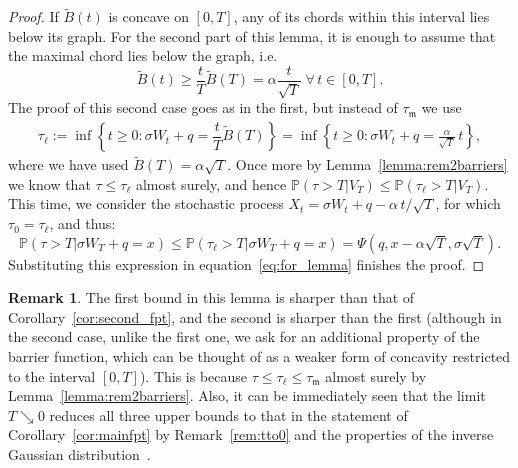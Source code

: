 \documentclass[12pt]{article}
\theoremstyle{definition}
\newtheorem{remark}{Remark}[theorem]
\begin{document}
\begin{proof}
If $\tilde{B}(t)$ is concave on $[0,T]$, any of its chords within this interval lies below its graph. For the second part of this lemma, it is enough to assume that the maximal chord lies below the graph, i.e. 
$$\tilde{B}(t)\geq \dfrac{t}{T}\tilde{B}(T)=\alpha\dfrac{t}{\sqrt{T}}\;\forall \, t\in[0,T].$$
The proof of this second case goes as in the first, but instead of $\tau_{\mathfrak{m}}$ we use
\begin{eqnarray}\nonumber
\tau_\ell := \inf \! \left\{t \ge 0 : \sigma W_t +q=\dfrac{t}{T}\tilde{B}(T) \right\} =\inf \! \left\{t \ge 0 : \sigma W_t +q= \frac{\alpha}{\sqrt{T}} \, t \right\},
\end{eqnarray}
where we have used $\tilde{B}(T)=\alpha\sqrt{T}$. Once more by Lemma~\ref{lemma:rem2barriers} we know that $\tau \le \tau_\ell$ almost surely, and hence $\mathbb{P}(\tau > T\vert V_T) \le \mathbb{P}(\tau_\ell > T\vert V_T)$. This time, we consider the stochastic process $X_t=\sigma W_t+q-\alpha \, t/\sqrt{T}$, for which $\tau_0=\tau_\ell$, and thus:
$$
\mathbb{P}(\tau > T\vert \sigma W_T+q=x) \le\mathbb{P}(\tau_\ell > T\vert \sigma W_T+q=x)=\Psi \! \left(q,x-\alpha\sqrt{T},\sigma\sqrt{T} \right).
$$
Substituting this expression in equation~\eqref{eq:for_lemma} finishes the proof.

\end{proof}

\begin{remark}
The first bound in this lemma is sharper than that of Corollary~\ref{cor:second_fpt}, and the second is sharper than the first (although in the second case, unlike the first one, we ask for an additional property of the barrier function, which can be thought of as a weaker form of concavity restricted to the interval $[0,T]$). This is because $\tau \le \tau_\ell \le \tau_\mathfrak{m}$ almost surely by Lemma~\ref{lemma:rem2barriers}. Also, it can be immediately seen that the limit $T \searrow 0$ reduces all three upper bounds to that in the statement of Corollary~\ref{cor:mainfpt} by Remark~\ref{rem:tto0} and the properties of the inverse Gaussian distribution~\cite{Seshadri1999}.
\end{remark}
\end{document}
